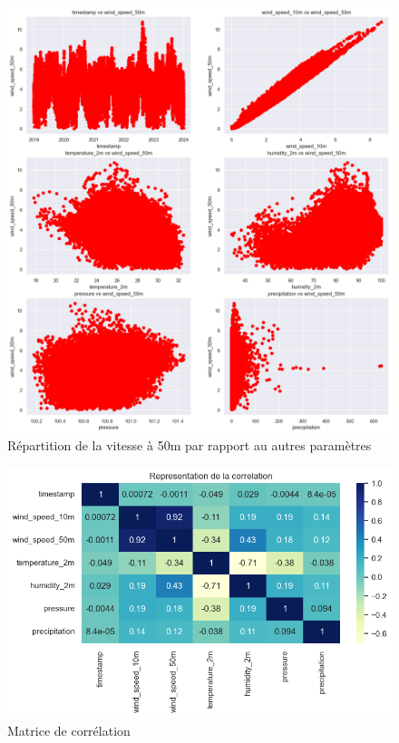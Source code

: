 \documentclass[12pt]{article}
\begin{document}
\begin{itemize}[label=$\color{blue}\diamond$]
\begin{itemize}
\begin{figure}[H]
			\includegraphics[width=1\linewidth]{"../graphique/ParamsWindds"}
			\caption{Répartition de la vitesse à 50m par rapport au autres paramètres}
			\label{fig:ParamsWindds}
		\end{figure}
		\begin{figure}[H]
			\centering
			\includegraphics[width=1\linewidth]{"../graphique/matrice_corr"}
			\caption{Matrice de corrélation}
			\label{fig:matrice_corr}
		\end{figure}

\end{itemize}
\end{itemize}
\end{document}

